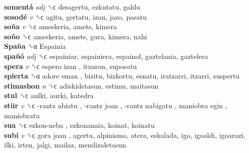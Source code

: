 \textbf{somentá} \emph{adj}  ␝ϲ  desagertu, ezkutatu, galdu  \\
\textbf{sosodé} \emph{v}  ␝ϲ  agitu, gertatu, izan, jazo, pasatu  \\
\textbf{soña} \emph{v}  ␝ϲ  ameskeria, amets, kimera  \\
\textbf{soño} ␝ϲ  ameskeria, amets, gura, kimera, nahi  \\
\textbf{Spaña} ␝α   Espainia   \\
\textbf{spañó} \emph{adj}  ␝ϲ  espainiar, espainiera, espainol, gaztelania, gaztelera  \\
\textbf{spera} \emph{v}  ␝ϲ   espero izan , itxaron, suposatu  \\
\textbf{spierta} ␝α   adore eman , bizitu, bizkortu, esnatu, iratzarri, itzarri, suspertu  \\
\textbf{stimashon} \emph{n}  ␝ϲ  adiskidetasun, estimu, maitasun  \\
\textbf{stul} ␝ϲ  aulki, aurki, katedra  \\
\textbf{stür} \emph{v}  ␝ϲ   -rantz abiatu ,  -rantz joan ,  -rantz nabigatu ,  maniobra egin , maniobratu  \\
\textbf{sua} ␝ϲ   ezkon-neba , ezkonanaia, koinat, koinatu  \\
\textbf{subi} \emph{v}  ␝ϲ   gora joan , agertu, alpinismo, atera, eskalada, igo, igoaldi, igoarazi, ilki, irten, jalgi, mailaz, mendizaletasun  \\
